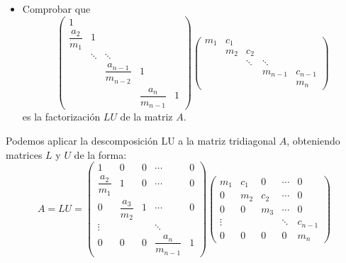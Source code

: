 {\begin{itemize}
\[\begin{cases}
                x_n = g_n \\
                x_k = g_k - \dfrac{c_k}{m_k} x_{k+1}, \quad k = n-1, n-2, \ldots, 1.
            \end{cases}
        \]
        \item[d)] Comprobar que
        \[
            \begin{pmatrix}
                1 & & & & \\
                \dfrac{a_2}{m_1} & 1 & & & \\
                & \ddots & \ddots & & \\
                & & \dfrac{a_{n-1}}{m_{n-2}} & 1 & \\
                & & & \dfrac{a_n}{m_{n-1}} & 1
            \end{pmatrix}
            \begin{pmatrix}
                m_1 & c_1 & & & \\
                & m_2 & c_2 & & \\
                & & \ddots & \ddots & \\
                & & & m_{n-1} & c_{n-1} \\
                & & & & m_n
            \end{pmatrix}
        \]
        es la factorización $LU$ de la matriz $A$.
    \end{itemize}
}{
    Podemos aplicar la descomposición LU a la matriz tridiagonal $A$, obteniendo matrices $L$ y $U$ de la forma:
        \[
            A = LU = 
            \begin{pmatrix}
                1 & 0 & 0 & \cdots & 0 \\
                \dfrac{a_2}{m_1} & 1 & 0 & \cdots & 0 \\
                0 & \dfrac{a_3}{m_2} & 1 & \cdots & 0 \\
                \vdots & & & \ddots & \\
                0 & 0 & 0 & \dfrac{a_n}{m_{n-1}} & 1
            \end{pmatrix}
            \begin{pmatrix}
                m_1 & c_1 & 0 & \cdots & 0 \\
                0 & m_2 & c_2 & \cdots & 0 \\
                0 & 0 & m_3 & \cdots & 0 \\
                \vdots & & & \ddots & c_{n-1} \\
                0 & 0 & 0 & 0 & m_n
            \end{pmatrix}
\]}
